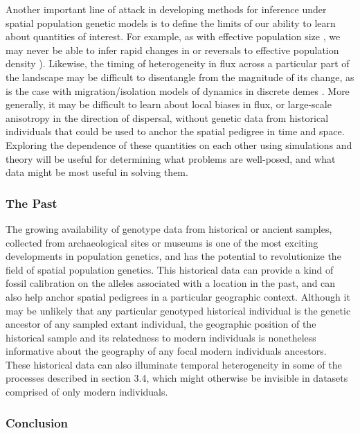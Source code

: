 \documentclass{ar-1col}
\begin{document}
Another important line of attack in developing methods for inference 
under spatial population genetic models 
is to define the limits of our ability to learn about 
quantities of interest.
For example, 
as with effective population size \citep{Myers2008},
we may never be able to infer rapid changes in 
or reversals to effective population density
\citep[although see also][]{BhaskarSong2014descartes}).
Likewise, 
the timing of heterogeneity in flux across a particular part of the landscape 
may be difficult to disentangle from the magnitude of its change, 
as is the case with migration/isolation models 
of dynamics in discrete demes \citep{sousa2011nonidentifiability}.
More generally,
it may be difficult to learn about local biases in flux, 
or large-scale anisotropy in the direction of dispersal,
without genetic data from historical individuals 
that could be used to anchor the spatial pedigree 
in time and space.
Exploring the dependence of these quantities on each other 
using simulations and theory 
will be useful for determining what problems are well-posed, 
and what data might be most useful in solving them.


\subsubsection{The Past} 
The growing availability of genotype data from historical or ancient samples, 
collected from archaeological sites or museums 
is one of the most exciting developments in population genetics, 
and has the potential to revolutionize the field of spatial population genetics.
This historical data can provide a kind of fossil calibration on 
the alleles associated with a location in the past, 
and can also help anchor spatial pedigrees in a particular geographic context.
Although it may be unlikely that any particular genotyped historical individual 
is the genetic ancestor of any sampled extant individual, 
the geographic position of the historical sample and its 
relatedness to modern individuals is nonetheless informative 
about the geography of any focal modern individuals ancestors.
These historical data can also illuminate temporal heterogeneity 
in some of the processes described in section 3.4, 
which might otherwise be invisible in datasets comprised of only modern individuals.

\subsubsection{Conclusion}
\end{document}
